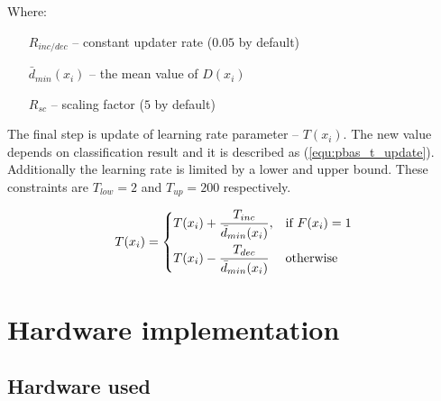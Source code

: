 \documentclass[b5paper,10pt,twoside]{article}
\begin{document}
{Where:
\begin{itemize}
	\item[$R_{inc/dec}$] -- constant updater rate ($0.05$ by default)
	\item[$\bar{d}_{min}(x_i)$] -- the mean value of $D(x_i)$
	\item[$R_{sc}$] -- scaling factor ($5$ by default)
\end{itemize}


The final step is update of learning rate parameter -- $T(x_i)$. The new value depends on classification result and it is described as (\ref{equ:pbas_t_update}). Additionally
the learning rate is limited by a lower and upper bound. These constraints are $T_{low}=2$ and $T_{up}=200$ respectively.


    \begin{equation}
	    T(x_i) = 
		\begin{dcases}
    		T(x_i) + \frac{T_{inc}}{\bar{d}_{min}(x_i)}, & \text{if } F(x_i)=1 \\
    		T(x_i) - \frac{T_{dec}}{\bar{d}_{min}(x_i)} & \text{otherwise} 
		\end{dcases}
	\label{equ:pbas_t_update}	
	\end{equation}

\section{Hardware implementation}
\label{sec:hw_implementation}

\subsection{Hardware used}
\label{subsec:hw_used}

}
\end{document}
